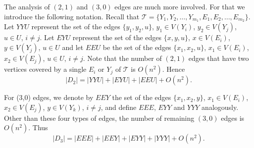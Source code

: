 \documentclass[11pt, reqno]{amsart}    	%
\theoremstyle{definition}
\def\cT{\mathcal T}
\numberwithin{equation}{section}
\begin{document}
	The analysis of $(2,1)$ and $(3,0)$ edges are much more involved.
	For that we introduce the following notation.
	Recall that $ \cT=\{Y_1,Y_2,\dots,Y_{m_{1}},E_1,E_2,\dots,E_{m_{2}}\} $.
	Let $ YYU $ represent the set of the edges $\{y_1,y_2,u\}$, $y_1\in V(Y_i)$, $y_2\in V(Y_j)$, $u\in U $, $ i\neq j $. 
	Let $ EYU $ represent the set of the edges $\{x,y,u\}$, $ x\in V(E_i)$, $y\in V(Y_j)$, $u\in U $ and let $ EEU $ be the set of the edges $\{x_1,x_2,u\}$, $ x_1\in V(E_i)$, $x_2\in V(E_j)$, $u\in U $, $ i\neq j $.  
	Note that the number of $(2,1)$ edges that have two vertices covered by a single $E_i$ or $Y_{j}$ of $\cT$ is $ O(n^2) $. 
	Hence 
	\[|D_{2}|=|YYU|+|EYU|+|EEU|+O(n^2).\]
	
	For (3,0) edges, we denote by $ EEY $ the set of the edges $\{x_1,x_2,y\}$, $x_1\in V(E_i)$, $x_2\in V(E_j)$, $y\in V(Y_k) $, $ i\neq j $, and define $EEE$, $EYY$ and $ YYY $ analogously. Other than these four types of edges, the number of remaining $(3,0)$ edges is $ O(n^2) $. Thus   \[|D_{3}|=|EEE|+|EEY|+|EYY|+|YYY|+O(n^2). \]
	
\end{document}

